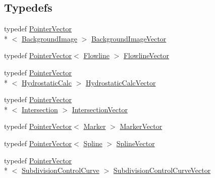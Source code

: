 \subsection*{Typedefs}
\begin{DoxyCompactItemize}
\item 
typedef \hyperlink{classPointerVector}{Pointer\-Vector}\\*
$<$ \hyperlink{classShipCAD_1_1BackgroundImage}{Background\-Image} $>$ \hyperlink{namespaceShipCAD_ac421659cf582dda585c31351043a79d3}{Background\-Image\-Vector}
\item 
typedef \hyperlink{classPointerVector}{Pointer\-Vector}$<$ \hyperlink{classShipCAD_1_1Flowline}{Flowline} $>$ \hyperlink{namespaceShipCAD_a266f1cbe13c1087079b277baa825b85d}{Flowline\-Vector}
\item 
typedef \hyperlink{classPointerVector}{Pointer\-Vector}\\*
$<$ \hyperlink{classShipCAD_1_1HydrostaticCalc}{Hydrostatic\-Calc} $>$ \hyperlink{namespaceShipCAD_a0c7b012d8868cbb43871cf0bf303ccc6}{Hydrostatic\-Calc\-Vector}
\item 
typedef \hyperlink{classPointerVector}{Pointer\-Vector}\\*
$<$ \hyperlink{classShipCAD_1_1Intersection}{Intersection} $>$ \hyperlink{namespaceShipCAD_a9910f0963197f9df6125398efd4fa139}{Intersection\-Vector}
\item 
typedef \hyperlink{classPointerVector}{Pointer\-Vector}$<$ \hyperlink{classShipCAD_1_1Marker}{Marker} $>$ \hyperlink{namespaceShipCAD_a36fff5b53986f6d6976afc749463ef22}{Marker\-Vector}
\item 
typedef \hyperlink{classPointerVector}{Pointer\-Vector}$<$ \hyperlink{classShipCAD_1_1Spline}{Spline} $>$ \hyperlink{namespaceShipCAD_a053b941b2c87049bb9380428d4d5a056}{Spline\-Vector}
\item 
typedef \hyperlink{classPointerVector}{Pointer\-Vector}\\*
$<$ \hyperlink{classShipCAD_1_1SubdivisionControlCurve}{Subdivision\-Control\-Curve} $>$ \hyperlink{namespaceShipCAD_aa9dd7a826ae5254e377dac43ea19da80}{Subdivision\-Control\-Curve\-Vector}
\end{DoxyCompactItemize}

